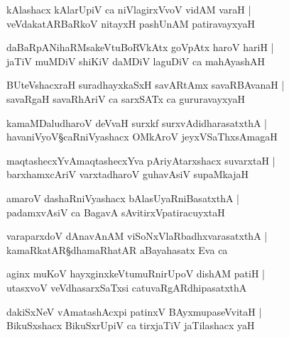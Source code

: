 \begin{shloka}
kAlashacx kAlarUpiV ca niVlagirxVvoV vidAM varaH |\\
veVdakatARBaRkoV nitayxH pashUnAM patiravayxyaH 
\end{shloka}

\begin{shloka}
daBaRpANihaRMsakeVtuBoRVkAtx goVpAtx haroV hariH |\\
jaTiV muMDiV shiKiV daMDiV laguDiV ca mahAyashAH 
\end{shloka}

\begin{shloka}
BUteVshacxraH suradhayxkaSxH savARtAmx savaRBAvanaH |\\
savaRgaH savaRhAriV ca sarxSATx ca gururavayxyaH 
\end{shloka}

\begin{shloka}
kamaMDaludharoV deVvaH surxkf surxvAdidharasatxthA |\\
havaniVyoV\S caRniVyashacx OMkAroV jeyxVSaThxsAmagaH 
\end{shloka}

\begin{shloka}
maqtashecxYvAmaqtashecxYva pAriyAtarxshacx suvarxtaH |\\
barxhamxcAriV varxtadharoV guhavAsiV supaMkajaH 
\end{shloka}

\begin{shloka}
amaroV dashaRniVyashacx bAlasUyaRniBasatxthA |\\
padamxvAsiV ca BagavA\R{} sAvitirxVpatiracuyxtaH 
\end{shloka}

\begin{shloka}
varaparxdoV dAnavAnAM viSoNxVlaRbadhxvarasatxthA |\\
kamaRkatAR\S dhamaRhatAR aBayahasatx Eva ca 
\end{shloka}

\begin{shloka}
aginx muKoV hayxginxkeVtumuRnirUpoV dishAM patiH |\\
utasxvoV veVdhasarxSaTxsi catuvaRgARdhipasatxthA 
\end{shloka}

\begin{shloka}
dakiSxNeV vAmatashAcxpi patinxV BAyxmupaseVvitaH |\\
BikuSxshacx BikuSxrUpiV ca tirxjaTiV jaTilashacx yaH 
\end{shloka}

